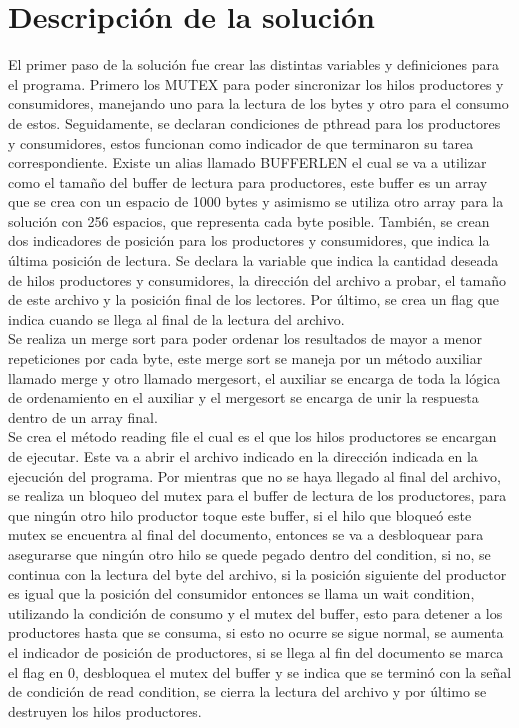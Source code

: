 \documentclass[10pt, article, natbib]{IEEEtran}
\begin{document}
\section{Descripción de la solución}
El primer paso de la solución fue crear las distintas variables y definiciones para el programa. Primero los MUTEX para poder sincronizar los hilos productores y consumidores, manejando uno para la lectura de los bytes y otro para el consumo de estos.\cite{cppdev_2010_c} \cite{manrow_2011_c} Seguidamente, se declaran condiciones de pthread para los productores y consumidores, estos funcionan como indicador de que terminaron su tarea correspondiente.\cite{theopengroup_1997_pthread_cond_wait} Existe un alias llamado BUFFERLEN el cual se va a utilizar como el tamaño del buffer de lectura para productores, este buffer es un array que se crea con un espacio de 1000 bytes y asimismo se utiliza otro array para la solución con 256 espacios, que representa cada byte posible. También, se crean dos indicadores de posición para los productores y consumidores, que indica la última posición de lectura. Se declara la variable que indica la cantidad deseada de hilos productores y consumidores, la dirección del archivo a probar, el tamaño de este archivo y la posición final de los lectores. Por último, se crea un flag que indica cuando se llega al final de la lectura del archivo.\\

Se realiza un merge sort para poder ordenar los resultados de mayor a menor repeticiones por cada byte, este merge sort se maneja por un método auxiliar llamado merge y otro llamado mergesort, el auxiliar se encarga de toda la lógica de ordenamiento en el auxiliar y el mergesort se encarga de unir la respuesta dentro de un array final.\\

Se crea el método reading file el cual es el que los hilos productores se encargan de ejecutar. Este va a abrir el archivo indicado en la dirección indicada en la ejecución del programa.\cite{chanilastnam_2015_c} \cite{cppreferencecom_2021_fread} \cite{kerrisk_2010_fseek3} Por mientras que no se haya llegado al final del archivo, se realiza un bloqueo del mutex para el buffer de lectura de los productores, para que ningún otro hilo productor toque este buffer, si el hilo que bloqueó este mutex se encuentra al final del documento, entonces se va a desbloquear para asegurarse que ningún otro hilo se quede pegado dentro del condition, si no, se continua con la lectura del byte del archivo, si la posición siguiente del productor es igual que la posición del consumidor entonces se llama un wait condition, utilizando la condición de consumo y el mutex del buffer, esto para detener a los productores hasta que se consuma, si esto no ocurre se sigue normal, se aumenta el indicador de posición de productores, si se llega al fin del documento se marca el flag en 0, desbloquea el mutex del buffer y se indica que se terminó con la señal de condición de read condition, se cierra la lectura del archivo y por último se destruyen los hilos productores.\cite{kerrisk_2010_pthread_exit3} \\
\end{document}

